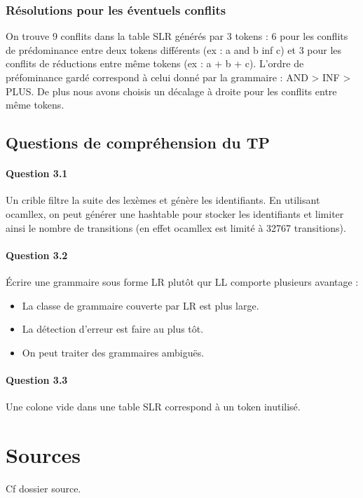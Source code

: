 \documentclass[a4paper]{article}
\begin{document}
\subsubsection{Résolutions pour les éventuels conflits}
On trouve 9 conflits dans la table SLR générés par 3 tokens : 6 pour les conflits de prédominance entre deux tokens différents (ex : a and b inf c) et 3 pour les conflits de réductions entre même tokens (ex : a + b + c).
L'ordre de préfominance gardé correspond à celui donné par la grammaire : AND > INF > PLUS.
De plus nous avons choisis un décalage à droite pour les conflits entre même tokens.

\subsection{Questions de compréhension du TP}

\paragraph{Question 3.1}
Un crible filtre la suite des lexèmes et génère les identifiants. En utilisant ocamllex, on peut générer une hashtable pour stocker les identifiants et limiter ainsi le nombre de transitions (en effet ocamllex est limité à 32767 transitions).

\paragraph{Question 3.2}
Écrire une grammaire sous forme LR plutôt qur LL comporte plusieurs avantage :
\begin{itemize}
  \item La classe de grammaire couverte par LR est plus large.
  \item La détection d'erreur est faire au plus tôt.
  \item On peut traiter des grammaires ambiguës.
\end{itemize}

\paragraph{Question 3.3}
Une colone vide dans une table SLR correspond à un token inutilisé.

\section{Sources}

Cf dossier source.
\end{document}
